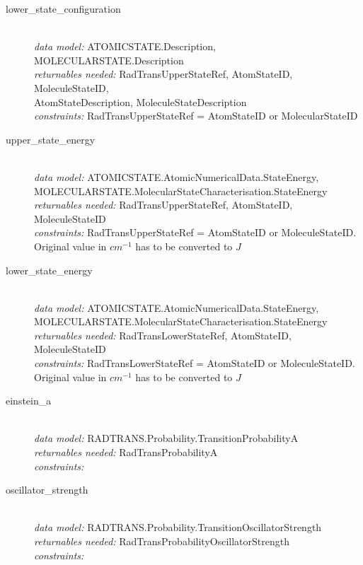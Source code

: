 \documentclass[11pt,a4paper]{ivoa}
\begin{document}
\begin{description}
	\item [lower\_state\_configuration]\hfill\\
	\textit{data model:} ATOMICSTATE.Description, MOLECULARSTATE.Description\\
	\textit{returnables needed:} RadTransUpperStateRef, AtomStateID, 
MoleculeStateID,\\ 
AtomStateDescription, MoleculeStateDescription\\
	\textit{constraints:}  RadTransUpperStateRef = AtomStateID or MolecularStateID
	
	\item [upper\_state\_energy]\hfill\\
	\textit{data model:} ATOMICSTATE.AtomicNumericalData.StateEnergy, \\ 
MOLECULARSTATE.MolecularStateCharacterisation.StateEnergy\\
	\textit{returnables needed:} RadTransUpperStateRef, AtomStateID, 
MoleculeStateID\\
	\textit{constraints:} 
 RadTransUpperStateRef = AtomStateID or MoleculeStateID. 
 Original value in $cm^{-1}$ has to be converted to $J$
	
	\item [lower\_state\_energy]\hfill\\
	\textit{data model:} ATOMICSTATE.AtomicNumericalData.StateEnergy, \\ 
MOLECULARSTATE.MolecularStateCharacterisation.StateEnergy\\
	\textit{returnables needed:} RadTransLowerStateRef, AtomStateID,  
MoleculeStateID\\
	\textit{constraints:}  RadTransLowerStateRef = AtomStateID or MoleculeStateID.
	Original value in $cm^{-1}$ has to be converted to $J$

	\item [einstein\_a]\hfill\\
	\textit{data model:}  RADTRANS.Probability.TransitionProbabilityA\\
	\textit{returnables needed:} RadTransProbabilityA\\
	\textit{constraints:}

	\item [oscillator\_strength]\hfill\\
	\textit{data model:}  RADTRANS.Probability.TransitionOscillatorStrength\\
	\textit{returnables needed:} RadTransProbabilityOscillatorStrength\\
        \textit{constraints:}


\end{description}
\end{document}
